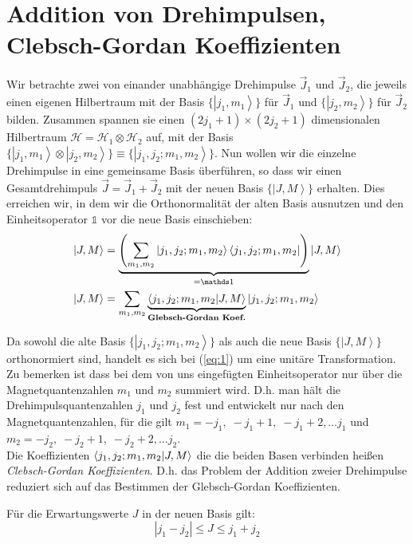 \documentclass[12pt,a4paper,titlepage,oneside]{article}
\newcommand\bra[1]{\left\langle #1 \right|}
\newcommand\ket[1]{\left| #1 \right\rangle}
\newcommand\braket[2]{%
  \left\langle \vphantom{#2} #1%
    \middle|%
    \vphantom{#1} #2\right\rangle}%
\begin{document}
\section{Addition von Drehimpulsen, Clebsch-Gordan Koeffizienten}
\label{sec:addit-von-dreh}

Wir betrachte zwei von einander unabhängige Drehimpulse \(\vec J_1\) und \(\vec
J_2\), die jeweils einen eigenen Hilbertraum mit der Basis \(\{\ket{j_1,m_1}\}\)
für \(\vec J_1\) und \(\{\ket{j_2,m_2}\}\) für \(\vec J_2\) bilden. Zusammen
spannen sie einen \((2j_1+1) \times (2j_2+1)\) dimensionalen Hilbertraum
\(\mathcal H = \mathcal H_1 \otimes \mathcal H_2\) auf, mit der Basis
\(\{\ket{j_1,m_1} \otimes \ket{j_2,m_2}\} \equiv \{\ket{j_1,j_2;m_1,m_2}\}\).
Nun wollen wir die einzelne Drehimpulse in eine gemeinsame Basis überführen, so
dass wir einen Gesamtdrehimpuls \(\vec J=\vec J_1+\vec J_2\) mit der neuen Basis
\(\{\ket{J,M}\}\) erhalten. Dies erreichen wir, in dem wir die Orthonormalität
der alten Basis ausnutzen und den Einheitsoperator \(\mathds 1\) vor die neue
Basis einschieben:
\begin{align}
  \label{eq:1}
  \ket{J,M}&=\underbrace{\left(
      \sum_{m_1,m_2}\ket{j_1,j_2;m_1,m_2}\bra{j_1,j_2;m_1,m_2}
    \right)}_{= \mathds 1}
  \ket{J,M}\notag\\
   \ket{J,M}&= \sum_{m_1,m_2} 
   \underbrace{\braket{j_1,j_2;m_1,m_2}{J,M}}_
   {\text{\textbf{Glebsch-Gordan Koef.}}}
   \ket{j_1,j_2;m_1,m_2}
\end{align}

Da sowohl die alte Basis \( \{\ket{j_1,j_2;m_1,m_2}\}\) als auch die neue Basis
\(\{\ket{J,M}\}\) orthonormiert sind, handelt es sich bei (\ref{eq:1}) um eine
unitäre Transformation. Zu bemerken ist dass bei dem von uns eingefügten
Einheitsoperator nur über die Magnetquantenzahlen \(m_1\) und \(m_2\) summiert
wird. D.h. man hält die Drehimpulsquantenzahlen \(j_1\) und \(j_2\) fest und
entwickelt nur nach den Magnetquantenzahlen, für die gilt \(m_1 = -j_1,\; -j_1+1,
\;-j_1+2, \dots j_1\) und \(m_2 = -j_2, \;-j_2+1,\;-j_2+2, \dots j_2\).\\
Die Koeffizienten \( \braket{j_1,j_2;m_1,m_2}{J,M} \) die die beiden Basen verbinden
heißen \emph{Clebsch-Gordan Koeffizienten}. D.h. das Problem der Addition zweier
Drehimpulse reduziert sich auf das Bestimmen der Glebsch-Gordan Koeffizienten.

Für die Erwartungswerte \(J\) in der neuen Basis gilt:
\begin{equation}
  \label{eq:8}
  \boxed{|j_1-j_2|\leq J\leq j_1+j_2}
\end{equation}
\end{document}
